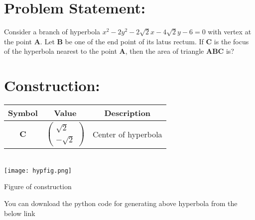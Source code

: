 \documentclass[10pt,a4paper]{report}
\newcommand{\myvec}[1]{\ensuremath{\begin{pmatrix}#1\end{pmatrix}}}
\let\vec\mathbf
\begin{document}
\begin{multicols}{2}
\section*{Problem Statement:}
Consider a branch of hyperbola $x^{2}-2y^{2}-2\sqrt{2}x-4\sqrt{2}y-6=0$ with vertex at the point $\vec{A}$. Let $\vec{B}$ be one of the end point of its latus rectum. If $\vec{C}$ is the focus of the hyperbola nearest to the point $\vec{A}$, then the area of triangle $\vec{A}\vec{B}\vec{C}$ is?
\section*{Construction:}
\hspace{0.25cm}
\begin{tabular}{|c|c|c|}
	\hline
	\textbf{Symbol}&\textbf{Value}&\textbf{Description}\\
	\hline
	$\vec{C}$&$\myvec{\sqrt{2} \\ -\sqrt{2}}$&Center of hyperbola\\
	\hline
\end{tabular}
\vspace{0.5cm}\\
\texttt{[image: hypfig.png]}
\begin{center}
Figure of construction
\end{center} 
You can download the python code for generating above hyperbola from the below link
\vspace{0.25cm}\\


\end{multicols}
\end{document}
